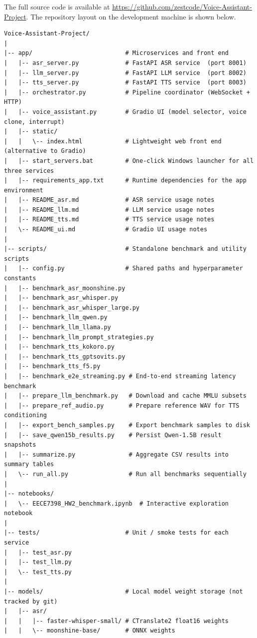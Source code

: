 \documentclass[12pt, a4paper]{article}
\begin{document}
The full source code is available at \url{https://github.com/zestcode/Voice-Assistant-Project}.
The repository layout on the development machine is shown below.

\begin{verbatim}
Voice-Assistant-Project/
|
|-- app/                          # Microservices and front end
|   |-- asr_server.py             # FastAPI ASR service  (port 8001)
|   |-- llm_server.py             # FastAPI LLM service  (port 8002)
|   |-- tts_server.py             # FastAPI TTS service  (port 8003)
|   |-- orchestrator.py           # Pipeline coordinator (WebSocket + HTTP)
|   |-- voice_assistant.py        # Gradio UI (model selector, voice clone, interrupt)
|   |-- static/
|   |   \-- index.html            # Lightweight web front end (alternative to Gradio)
|   |-- start_servers.bat         # One-click Windows launcher for all three services
|   |-- requirements_app.txt      # Runtime dependencies for the app environment
|   |-- README_asr.md             # ASR service usage notes
|   |-- README_llm.md             # LLM service usage notes
|   |-- README_tts.md             # TTS service usage notes
|   \-- README_ui.md              # Gradio UI usage notes
|
|-- scripts/                      # Standalone benchmark and utility scripts
|   |-- config.py                 # Shared paths and hyperparameter constants
|   |-- benchmark_asr_moonshine.py
|   |-- benchmark_asr_whisper.py
|   |-- benchmark_asr_whisper_large.py
|   |-- benchmark_llm_qwen.py
|   |-- benchmark_llm_llama.py
|   |-- benchmark_llm_prompt_strategies.py
|   |-- benchmark_tts_kokoro.py
|   |-- benchmark_tts_gptsovits.py
|   |-- benchmark_tts_f5.py
|   |-- benchmark_e2e_streaming.py # End-to-end streaming latency benchmark
|   |-- prepare_llm_benchmark.py   # Download and cache MMLU subsets
|   |-- prepare_ref_audio.py       # Prepare reference WAV for TTS conditioning
|   |-- export_bench_samples.py    # Export benchmark samples to disk
|   |-- save_qwen15b_results.py    # Persist Qwen-1.5B result snapshots
|   |-- summarize.py               # Aggregate CSV results into summary tables
|   \-- run_all.py                 # Run all benchmarks sequentially
|
|-- notebooks/
|   \-- EECE7398_HW2_benchmark.ipynb  # Interactive exploration notebook
|
|-- tests/                        # Unit / smoke tests for each service
|   |-- test_asr.py
|   |-- test_llm.py
|   \-- test_tts.py
|
|-- models/                       # Local model weight storage (not tracked by git)
|   |-- asr/
|   |   |-- faster-whisper-small/ # CTranslate2 float16 weights
|   |   \-- moonshine-base/       # ONNX weights

\end{verbatim}
\end{document}
